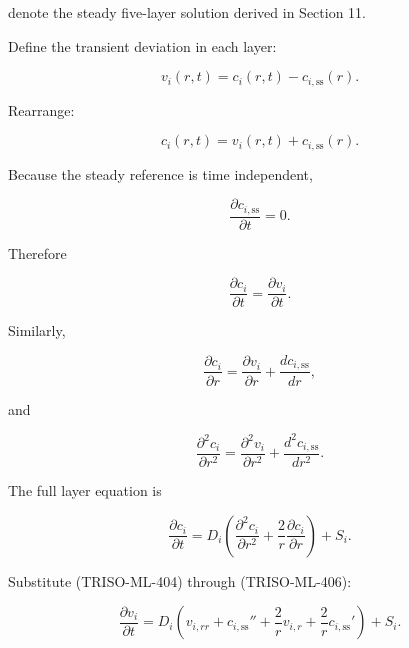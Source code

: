 \documentclass[11pt,a4paper]{article}
\begin{document}
denote the steady five-layer solution derived in Section 11.

Define the transient deviation in each layer:

\begin{equation}
\boxed{
v_i(r,t)
=
c_i(r,t)-c_{i,\mathrm{ss}}(r).
}
\tag{TRISO-ML-401}
\label{eq:triso-ml-401}
\end{equation}

Rearrange:

\begin{equation}
c_i(r,t)
=
v_i(r,t)+c_{i,\mathrm{ss}}(r).
\tag{TRISO-ML-402}
\label{eq:triso-ml-402}
\end{equation}

Because the steady reference is time independent,

\begin{equation}
\frac{\partial c_{i,\mathrm{ss}}}{\partial t}=0.
\tag{TRISO-ML-403}
\label{eq:triso-ml-403}
\end{equation}

Therefore

\begin{equation}
\frac{\partial c_i}{\partial t}
=
\frac{\partial v_i}{\partial t}.
\tag{TRISO-ML-404}
\label{eq:triso-ml-404}
\end{equation}

Similarly,

\begin{equation}
\frac{\partial c_i}{\partial r}
=
\frac{\partial v_i}{\partial r}
+
\frac{dc_{i,\mathrm{ss}}}{dr},
\tag{TRISO-ML-405}
\label{eq:triso-ml-405}
\end{equation}

and

\begin{equation}
\frac{\partial^2c_i}{\partial r^2}
=
\frac{\partial^2v_i}{\partial r^2}
+
\frac{d^2c_{i,\mathrm{ss}}}{dr^2}.
\tag{TRISO-ML-406}
\label{eq:triso-ml-406}
\end{equation}

The full layer equation is

\begin{equation}
\frac{\partial c_i}{\partial t}
=
D_i
\left(
\frac{\partial^2c_i}{\partial r^2}
+
\frac2r\frac{\partial c_i}{\partial r}
\right)
+
S_i.
\tag{TRISO-ML-407}
\label{eq:triso-ml-407}
\end{equation}

Substitute (TRISO-ML-404) through (TRISO-ML-406):

\begin{equation}
\frac{\partial v_i}{\partial t}
=
D_i
\left(
v_{i,rr}
+
c_{i,\mathrm{ss}}''
+
\frac2r v_{i,r}
+
\frac2r c_{i,\mathrm{ss}}'
\right)
+
S_i.
\tag{TRISO-ML-408}
\label{eq:triso-ml-408}
\end{equation}
\end{document}
